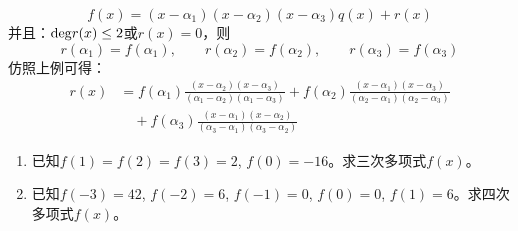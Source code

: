 \begin{solution}
\[f(x)=(x-\alpha_1)(x-\alpha_2)(x-\alpha_3)q(x)+r(x)\]
并且：${\rm deg}r(x)\le 2$或$r(x)=0$，则
\[r(\alpha_1)=f(\alpha_1),\qquad r(\alpha_2)=f(\alpha_2),\qquad r(\alpha_3)=f(\alpha_3)\]
 仿照上例可得：
 \[\begin{split}
     r(x)&=f(\alpha_1)\frac{(x-\alpha_2)(x-\alpha_3)}{(\alpha_1-\alpha_2)(\alpha_1-\alpha_3)} +f(\alpha_2)\frac{(x-\alpha_1)(x-\alpha_3)}{(\alpha_2-\alpha_1)(\alpha_2-\alpha_3)}
     \\
&\quad     +f(\alpha_3)\frac{(x-\alpha_1)(x-\alpha_2)}{(\alpha_3-\alpha_1)(\alpha_3-\alpha_2)}
 \end{split}\]
\end{solution}

\begin{ex}
\begin{enumerate}
    \item 已知$f(1)=f(2)=f(3)=2$, $f(0)=-16$。求三次多项式$f(x)$。
    \item 已知$f(-3)=42$, $f(-2)=6$, $f(-1)=0$, $f(0)=0$, $f(1)=6$。求四次多项式$f(x)$。
\end{enumerate} 
\end{ex}






























